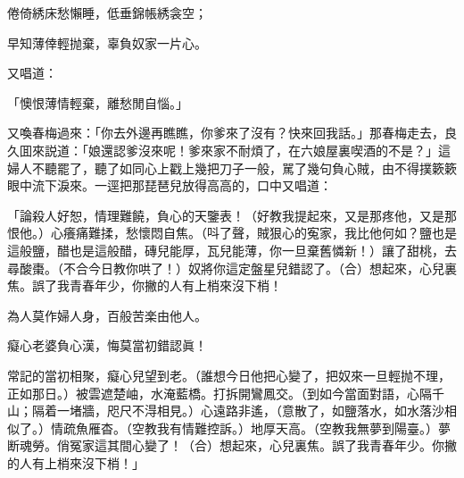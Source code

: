 \begin{myquote}
倦倚綉床愁懶睡，低垂錦帳綉衾空；

早知薄倖輕抛棄，辜負奴家一片心。
\end{myquote}

又唱道：

\begin{myquote}
「懊恨薄情輕棄，離愁閒自惱。」
\end{myquote}

又喚春梅過來：「你去外邊再瞧瞧，你爹來了沒有？快來回我話。」那春梅走去，良久囬來説道：「娘還認爹沒來呢！爹來家不耐煩了，在六娘屋裏喫酒的不是？」這婦人不聽罷了，聽了如同心上戳上幾把刀子一般，駡了幾句負心賊，由不得撲簌簌眼中流下淚來。一逕把那琵琶兒放得高高的，口中又唱道：

\begin{myquote}
「論殺人好恕，情理難饒，負心的天鑒表！{\marktext\small\color{mydarkgray}（好教我提起來，又是那疼他，又是那恨他。）}心癢痛難揉，愁懷悶自焦。{\marktext\small\color{mydarkgray}（呌了聲，賊狠心的寃家，我比他何如？鹽也是這般鹽，醋也是這般醋，磚兒能厚，瓦兒能薄，你一旦棄舊憐新！）}讓了甜桃，去尋酸棗。{\marktext\small\color{mydarkgray}（不合今日教你哄了！）}奴將你這定盤星兒錯認了。{\marktext\small（合）}想起來，心兒裏焦。誤了我青春年少，你撇的人有上梢來沒下梢！　

為人莫作婦人身，百般苦楽由他人。

癡心老婆負心漢，悔莫當初錯認眞！

常記的當初相聚，癡心兒望到老。{\marktext\small\color{mydarkgray}（誰想今日他把心變了，把奴來一旦輕抛不理，正如那日。）}被雲遮楚岫，水淹藍橋。打拆開鸞鳳交。{\marktext\small\color{mydarkgray}（到如今當面對語，心隔千山；隔着一堵牆，咫尺不淂相見。）}心遠路非遙，{\marktext\small\color{mydarkgray}（意散了，如鹽落水，如水落沙相似了。）}情疏魚雁杳。{\marktext\small\color{mydarkgray}（空教我有情難控訴。）}地厚天高。{\marktext\small\color{mydarkgray}（空教我無夢到陽臺。）}夢断魂勞。俏冤家這其間心變了！{\marktext\small（合）}想起來，心兒裏焦。誤了我青春年少。你撇的人有上梢來沒下梢！」
\end{myquote}

